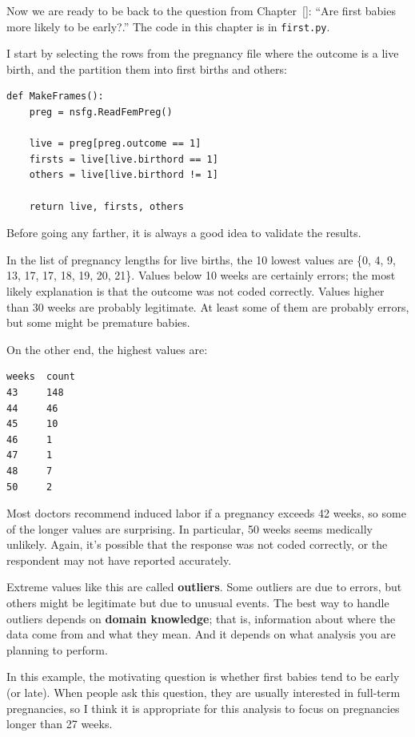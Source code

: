 \documentclass[12pt]{book}
\begin{document}
Now we are ready to be back to the question from Chapter~\ref{}:
``Are first babies more likely to be early?.''  The code in
this chapter is in {\tt first.py}.

I start by selecting the rows from the pregnancy file where the outcome
is a live birth, and the partition them into first births and others:

\begin{verbatim}
def MakeFrames():
    preg = nsfg.ReadFemPreg()

    live = preg[preg.outcome == 1]
    firsts = live[live.birthord == 1]
    others = live[live.birthord != 1]

    return live, firsts, others
\end{verbatim}

Before going any farther, it is always a good idea to validate the
results.  

In the list of pregnancy lengths for live births, the 10 lowest values
are \{0, 4, 9, 13, 17, 17, 18, 19, 20, 21\}.  Values below 10
weeks are certainly errors; the most likely explanation is that the
outcome was not coded correctly.
Values higher than 30 weeks are
probably legitimate.  At least some of them are probably errors, but
some might be premature babies.

On the other end, the highest values are:
%
\begin{verbatim}
weeks  count
43     148
44     46
45     10
46     1
47     1
48     7
50     2
\end{verbatim}

Most doctors recommend induced labor if a pregnancy exceeds 42 weeks,
so some of the longer values are surprising.  In particular, 50 weeks
seems medically unlikely.  Again, it's possible that the response
was not coded correctly, or the respondent may not have reported
accurately.

Extreme values like this are called {\bf outliers}.  Some outliers
are due to errors, but others might be legitimate but due to unusual
events.  The best way to handle outliers depends on {\bf domain knowledge};
that is, information about where the data come from and what they
mean.  And it depends on what analysis you are planning to perform.

In this example, the motivating question is whether first babies
tend to be early (or late).  When people ask this question, they are
usually interested in full-term pregnancies, so I think it is appropriate
for this analysis to focus on pregnancies longer than 27 weeks.
\end{document}
